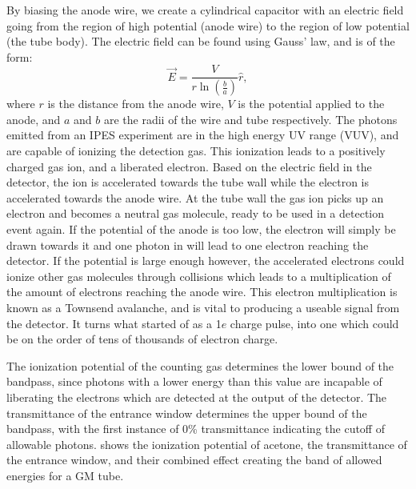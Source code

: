 By biasing the anode wire, we create a cylindrical capacitor with an electric field going from the region of high potential (anode wire) to the region of low potential (the tube body).
The electric field can be found using Gauss' law, and is of the form:
\begin{equation}
\vec{E} = \frac{V}{r\ln\left(\frac{b}{a}\right)}\hat{r},
\label{eq:efield}
\end{equation}
where $r$ is the distance from the anode wire, $V$ is the potential applied to the anode, and $a$ and $b$ are the radii of the wire and tube respectively. The photons emitted from an IPES experiment are in the high
energy UV range (VUV), and are capable of ionizing the detection gas. This ionization leads to a positively charged gas ion, and a liberated electron. Based on the electric field 
in the detector, the ion is accelerated towards the tube wall while the electron is accelerated towards the anode wire. At the tube wall the gas ion picks up an electron and becomes 
a neutral gas molecule, ready to be used in a detection event again. If the potential of the anode is too low, the electron will simply be drawn towards it and one photon in will lead
to one electron reaching the detector. If the potential is large enough however, the accelerated electrons could ionize other gas molecules through collisions which leads to a multiplication
of the amount of electrons reaching the anode wire. This electron multiplication is known as a Townsend avalanche\cite{knoll2010radiation}, and is vital to producing a useable signal from the detector. It turns
what started of as a 1$e$ charge pulse, into one which could be on the order of tens of thousands of electron charge\cite{funnemann198610}.

The ionization potential of the counting gas determines the lower bound of the bandpass, since photons with a lower energy than this value are incapable of liberating the electrons 
which are detected at the output of the detector. The transmittance of the entrance window determines the upper bound of the bandpass, with the first instance of 0\% transmittance
indicating the cutoff of allowable photons.  shows the ionization potential of acetone, the transmittance of the entrance window, and their combined effect creating
the band of allowed energies for a GM tube.

